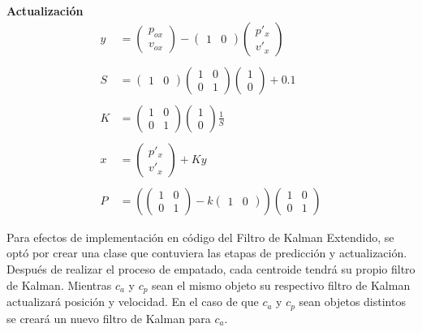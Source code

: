 \textbf{Actualización}
\begin{align*}
    y&=\begin{pmatrix} p_{ox} \\ v_{ox} \end{pmatrix} - \begin{pmatrix} 1 & 0 \end{pmatrix} \begin{pmatrix} p'_{x} \\ v'_{x} \end{pmatrix} \\ \\
    S&=\begin{pmatrix} 1 & 0 \end{pmatrix} \begin{pmatrix} 1 & 0 \\ 0 & 1 \end{pmatrix} \begin{pmatrix} 1 \\ 0 \end{pmatrix} + 0.1 \\ \\
    K&=\begin{pmatrix} 1 & 0 \\ 0 & 1 \end{pmatrix} \begin{pmatrix} 1 \\ 0 \end{pmatrix} \frac{1}{S} \\ \\
    x&=\begin{pmatrix} p'_{x} \\ v'_{x} \end{pmatrix} + K y \\ \\
    P&=\left( \begin{pmatrix} 1 & 0 \\ 0 & 1 \end{pmatrix} - k \begin{pmatrix} 1 & 0    \end{pmatrix} \right) \begin{pmatrix} 1 & 0 \\ 0 & 1 \end{pmatrix}
\end{align*}

Para efectos de implementación en código del Filtro de Kalman Extendido, se optó por crear una clase que contuviera las etapas de predicción y actualización. Después de realizar el proceso de empatado, cada centroide tendrá su propio filtro de Kalman. Mientras $c_a$ y $c_p$ sean el mismo objeto su respectivo filtro de Kalman actualizará posición y velocidad. En el caso de que $c_a$ y $c_p$ sean objetos distintos se creará un nuevo filtro de Kalman para $c_a$.
\newpage

